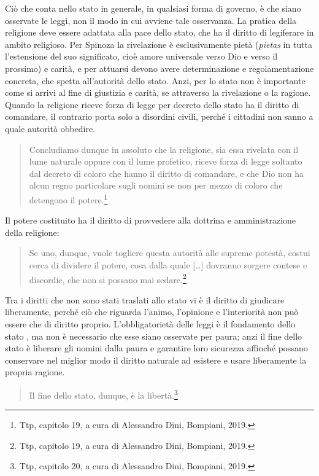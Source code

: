 Ciò che conta nello stato in generale, in qualsiasi forma di governo, è che siano osservate le leggi, non il modo in cui avviene tale osservanza. La pratica della religione deve essere adattata alla pace dello stato, che ha il diritto di legiferare in ambito religioso. Per Spinoza la rivelazione è esclusivamente pietà (\textit{pietas} in tutta l'estensione del suo significato, cioè amore universale verso Dio e verso il prossimo) e carità, e per attuarsi devono avere determinazione e regolamentazione concreta, che spetta all'autorità dello stato. Anzi, per lo stato non è importante come si arrivi al fine di giustizia e carità, se attraverso la rivelazione o la ragione. Quando la religione riceve forza di legge per decreto dello stato ha il diritto di comandare, il contrario porta solo a disordini civili, perché i cittadini non sanno a quale autorità obbedire. 

\begin{quotation}
	\small Concludiamo dunque in assoluto che la religione, sia essa rivelata con il lume naturale oppure con il lume profetico, riceve forza di legge soltanto dal decreto di coloro che hanno il diritto di comandare, e che Dio non ha alcun regno particolare sugli uomini se non per mezzo di coloro che detengono il potere.\footnote{Ttp, capitolo 19, a cura di Alessandro Dini, Bompiani, 2019.}
\end{quotation}

Il potere costituito ha il diritto di provvedere alla dottrina e amministrazione della religione:
\begin{quotation}
	\small Se uno, dunque, vuole togliere questa autorità alle supreme potestà, costui cerca di dividere il potere, cosa dalla quale [\dots] dovranno sorgere contese e discordie, che non si possano mai sedare.\footnote{Ttp, capitolo 19, a cura di Alessandro Dini, Bompiani, 2019.}
\end{quotation}

Tra i diritti che non sono stati traslati allo stato vi è il diritto di giudicare liberamente, perché ciò che riguarda l'animo, l'opinione e l'interiorità non può essere che di diritto proprio. L'obbligatorietà delle leggi è il fondamento dello stato , ma non è necessario che esse siano osservate per paura; anzi il fine dello stato è liberare gli uomini dalla paura e garantire  loro sicurezza affinché possano conservare nel miglior modo il diritto naturale ad esistere e usare liberamente la propria ragione.

\begin{quotation}
	\small Il fine dello stato, dunque, è la libertà.\footnote{Ttp, capitolo 20, a cura di Alessandro Dini, Bompiani, 2019.}
\end{quotation}

